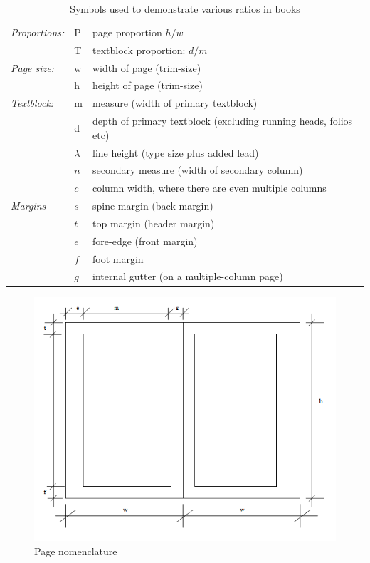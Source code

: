 \begin{table}[htbp]
\begin{tabular}{l l @{ = } p{6cm}}
\textit{Proportions:}      &P  &  page proportion $h/w$\\
~                      &T &  textblock proportion: $d/m$\\
\textit{Page size:}         &w &  width of page (trim-size)\\
~                      &h  & height of page (trim-size)\\
\textit{Textblock:}           &m & measure (width of primary textblock)\\
~                      &d  & depth of primary textblock (excluding running heads, folios etc)\\                      
~                      &$\lambda$ & line height (type size plus added lead)\\
~                      &$n$ & secondary measure (width of secondary column)\\
~                      &$c$  & column width, where there are even multiple columns\\
\textit{Margins}  &$s$  & spine margin (back margin)\\
~                      &$t$   & top margin (header margin)\\
                        &$e$  & fore-edge (front margin)\\
                        &$f$   & foot margin\\
                        &$g$  & internal gutter (on a multiple-column page)\\
\end{tabular}
\caption{Symbols used to demonstrate various ratios in books}
\end{table}
\medskip

\begin{figure}
  \includegraphics[width=\linewidth]{./graphics/page.png}
  \caption{Page nomenclature}
   \label{fig:marginfig1}
\end{figure}

